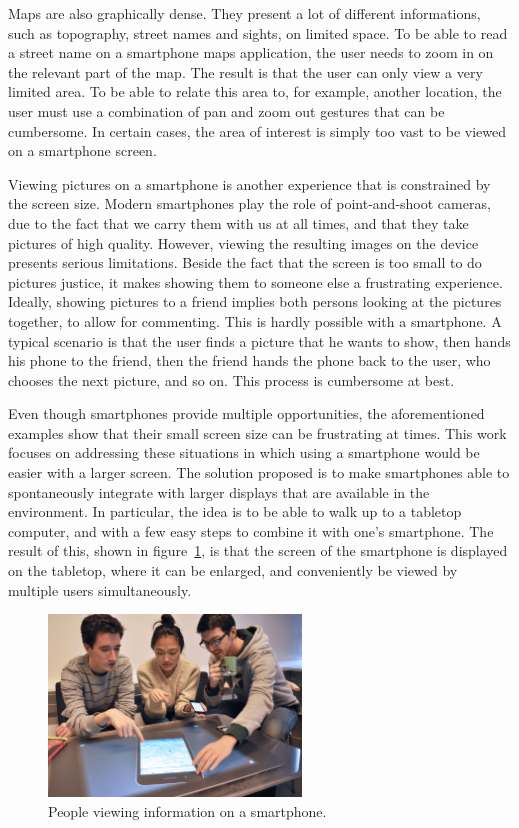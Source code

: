 Maps are also graphically dense.
They present a lot of different informations, such as topography, street names and sights, on limited space.
To be able to read a street name on a smartphone maps application, the user needs to zoom in on the relevant part of the map.
The result is that the user can only view a very limited area.
To be able to relate this area to, for example, another location, the user must use a combination of pan and zoom out gestures that can be cumbersome.
In certain cases, the area of interest is simply too vast to be viewed on a smartphone screen.

Viewing pictures on a smartphone is another experience that is constrained by the screen size.
Modern smartphones play the role of point-and-shoot cameras, due to the fact that we carry them with us at all times, and that they take pictures of high quality.
However, viewing the resulting images on the device presents serious limitations.
Beside the fact that the screen is too small to do pictures justice, it makes showing them to someone else a frustrating experience.
Ideally, showing pictures to a friend implies both persons looking at the pictures together, to allow for commenting.
This is hardly possible with a smartphone.
A typical scenario is that the user finds a picture that he wants to show, then hands his phone to the friend, then the friend hands the phone back to the user, who chooses the next picture, and so on.
This process is cumbersome at best.

Even though smartphones provide multiple opportunities, the aforementioned examples show that their small screen size can be frustrating at times.
This work focuses on addressing these situations in which using a smartphone would be easier with a larger screen.
The solution proposed is to make smartphones able to spontaneously integrate with larger displays that are available in the environment.
In particular, the idea is to be able to walk up to a tabletop computer, and with a few easy steps to combine it with one's smartphone.
The result of this, shown in figure~\ref{fig:tide}, is that the screen of the smartphone is displayed on the tabletop, where it can be enlarged, and conveniently be viewed by multiple users simultaneously.

\begin{figure}[htb]
  \centering
    \includegraphics[width=0.6\textwidth]{images/tide456}
  \caption{People viewing information on a smartphone.}
  \label{fig:tide}
\end{figure}

